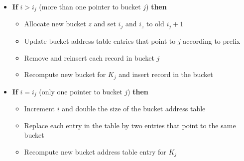 \begin{itemize}[label=\(\rhd\)]
\begin{itemize}[label=\(\rhd\)]
\begin{enumerate}
\begin{itemize}[label=\(\rhd\)]
                    \item \textbf{If} $i> i_j$ (more than one pointer to bucket $j$) \textbf{then} 
                    \begin{itemize}[label=\(\rhd\)]
                        \item Allocate new bucket $z$ and set $i_j$ and $i_z$ to old $i_j+1$ 
                        \item Update bucket address table entries that point to $j$ according to prefix
                        \item Remove and reinsert each record in bucket $j$
                        \item Recompute new bucket for $K_j$ and insert record in the bucket
                    \end{itemize}
                    \item \textbf{If} $i=i_j$ (only one pointer to bucket $j$) \textbf{then}
                    \begin{itemize}[label=\(\rhd\)]
                        \item Increment $i$ and double the size of the bucket address table
                        \item Replace each entry in the table by two entries that point to the same bucket
                        \item Recompute new bucket address table entry for $K_j$


\end{itemize}
\end{itemize}
\end{enumerate}
\end{itemize}
\end{itemize}

